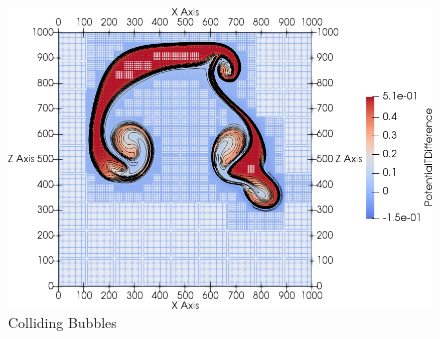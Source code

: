 \documentclass[runningheads]{llncs}
\begin{document}
\begin{figure}[tb]
  \centering
  \includegraphics[width=1.0\textwidth]{paper_two_bubbles}
  \caption{\label{fig:two-bubbles-ader}Colliding Bubbles \aderdg{}}
\end{figure}
\end{document}
